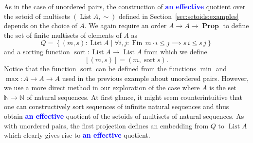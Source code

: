 \documentclass[envcountsame]{llncs}
\newcommand{\amend}[2][]{\textcolor{blue}{#2}}
\newcommand{\adefinable}{\amend[]{\textbf{an effective }}}
\newcommand{\N}{\mathbb{N}}
\providecommand{\class}[1]{[#1]}
\providecommand{\set}  [1]{\left\{#1\right\}}
\DeclareMathOperator{\Prop}{\mathbf{Prop}}
\DeclareMathOperator{\List}{List}
\DeclareMathOperator{\Fin}{Fin}
\DeclareMathOperator{\sort}{sort}
\begin{document}
As in the case of unordered pairs, the construction of \adefinable quotient over the setoid of multisets $(\List A,\sim)$ defined in Section~\ref{sec:setoids:examples} depends on the choice of $A$.  We again require an order $A\to A \to \Prop$ to define the set of finite multisets of elements of $A$ as
\[
Q = \set{(m , s) : \List A\mid  \forall i,j:\Fin\,m \cdot i\leq j\implies s\,i \leq s\,j}
\]
and a sorting function $\sort: \List A \to \List A$ from which we define
\[
\class{(m,s)} = (m,\sort s).
\]
Notice that the function $\sort$ can be defined from the functions $\min$ and $\max : A \to A \to A$ used in the previous example about unordered pairs. However, we use a more direct method in our exploration of the case where $A$ is the set $\N\to\N$ of natural sequences. At first glance, it might seem counterintuitive that one can constructively sort sequences of infinite natural sequences and thus obtain \adefinable quotient of the setoids of multisets of natural sequences.
As with unordered pairs, the first projection defines an embedding from $Q$ to $\List A$ which clearly gives rise to \adefinable quotient.
\end{document}
